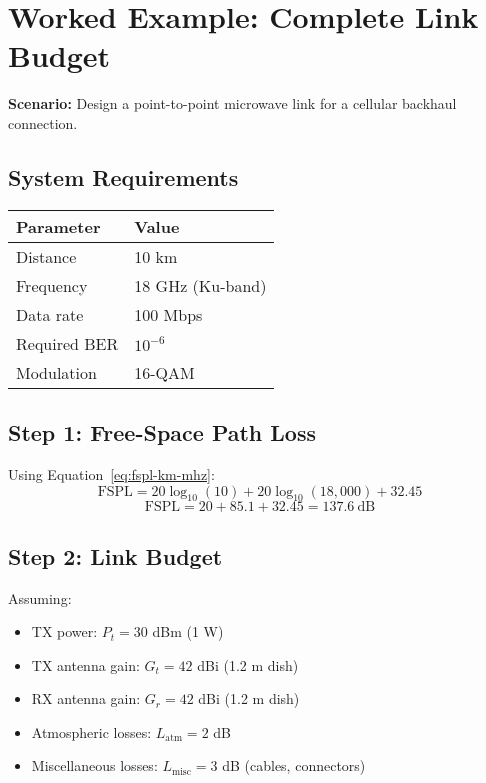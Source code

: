 \section{Worked Example: Complete Link Budget}
\label{sec:worked-example}

\textbf{Scenario:} Design a point-to-point microwave link for a cellular backhaul connection.

\subsection*{System Requirements}

\begin{tabular}{@{}ll@{}}
\toprule
\textbf{Parameter} & \textbf{Value} \\
\midrule
Distance & 10 km \\
Frequency & 18 GHz (Ku-band) \\
Data rate & 100 Mbps \\
Required BER & $10^{-6}$ \\
Modulation & 16-QAM \\
\bottomrule
\end{tabular}

\subsection*{Step 1: Free-Space Path Loss}

Using Equation~\ref{eq:fspl-km-mhz}:
\begin{equation}
\text{FSPL} = 20\log_{10}(10) + 20\log_{10}(18{,}000) + 32.45
\end{equation}
\begin{equation}
\text{FSPL} = 20 + 85.1 + 32.45 = 137.6\ \text{dB}
\end{equation}

\subsection*{Step 2: Link Budget}

Assuming:
\begin{itemize}
\item TX power: $P_t = 30$ dBm (1 W)
\item TX antenna gain: $G_t = 42$ dBi (1.2 m dish)
\item RX antenna gain: $G_r = 42$ dBi (1.2 m dish)
\item Atmospheric losses: $L_{\text{atm}} = 2$ dB
\item Miscellaneous losses: $L_{\text{misc}} = 3$ dB (cables, connectors)
\end{itemize}

